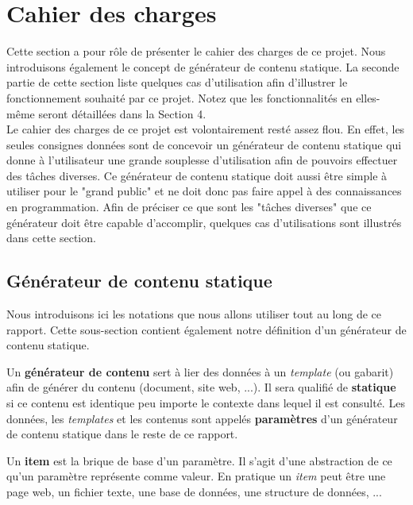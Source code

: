\section{Cahier des charges}

	Cette section a pour rôle de présenter le cahier des charges de ce projet. Nous introduisons également le concept de générateur de contenu statique. La seconde partie de cette section liste quelques cas d'utilisation afin d'illustrer le fonctionnement souhaité par ce projet. Notez que les fonctionnalités en elles-même seront détaillées dans la Section 4.\\
	
	Le cahier des charges de ce projet est volontairement resté assez flou. En effet, les seules consignes données sont de concevoir un générateur de contenu statique qui donne à l'utilisateur une grande souplesse d'utilisation afin de pouvoirs effectuer des tâches diverses. Ce générateur de contenu statique doit aussi être simple à utiliser pour le "grand public" et ne doit donc pas faire appel à des connaissances en programmation. Afin de préciser ce que sont les "tâches diverses" que ce générateur doit être capable d'accomplir, quelques cas d'utilisations sont illustrés dans cette section.\\
	
	
	\subsection{Générateur de contenu statique}
		Nous introduisons ici les notations que nous allons utiliser tout au long de ce rapport. Cette sous-section contient également notre définition d'un générateur de contenu statique. 
	
		\begin{defn}
			Un \textbf{générateur de contenu} sert à lier des données à un \textit{template} (ou gabarit) afin de générer du contenu (document, site web, ...). Il sera qualifié de \textbf{statique} si ce contenu est identique peu importe le contexte dans lequel il est consulté. Les données, les \textit{templates} et les contenus sont appelés \textbf{paramètres} d'un générateur de contenu statique dans le reste de ce rapport.
		\end{defn}
		
		\begin{defn}
			Un \textbf{item} est la brique de base d'un paramètre. Il s'agit d'une abstraction de ce qu'un paramètre représente comme valeur. En pratique un \textit{item} peut être une page web, un fichier texte, une base de données, une structure de données, ...
		\end{defn}
		
